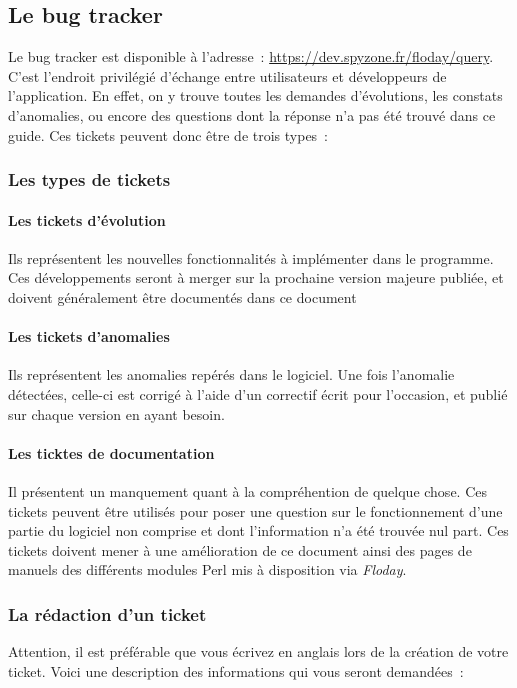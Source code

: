 \subsection{Le bug tracker}

Le bug tracker est disponible à l'adresse~: \url{https://dev.spyzone.fr/floday/query}.
C'est l'endroit privilégié d'échange entre utilisateurs et développeurs de l'application.
En effet, on y trouve toutes les demandes d'évolutions, les constats d'anomalies, ou encore des questions dont la réponse n'a pas été trouvé dans ce guide.
Ces tickets peuvent donc être de trois types~:

\subsubsection{Les types de tickets}
\paragraph{Les tickets d'évolution} Ils représentent les nouvelles fonctionnalités à implémenter dans le programme. Ces développements seront à merger sur la prochaine version majeure publiée, et doivent généralement être documentés dans ce document
\paragraph{Les tickets d'anomalies} Ils représentent les anomalies repérés dans le logiciel. Une fois l'anomalie détectées, celle-ci est corrigé à l'aide d'un correctif écrit pour l'occasion, et publié sur chaque version en ayant besoin.
\paragraph{Les ticktes de documentation} Il présentent un manquement quant à la compréhention de quelque chose. Ces tickets peuvent être utilisés pour poser une question sur le fonctionnement d'une partie du logiciel non comprise et dont l'information n'a été trouvée nul part. Ces tickets doivent mener à une amélioration de ce document ainsi des pages de manuels des différents modules Perl mis à disposition via \emph{Floday}.

\subsubsection{La rédaction d'un ticket}
Attention, il est préférable que vous écrivez en anglais lors de la création de votre ticket.
Voici une description des informations qui vous seront demandées~:
\newline

